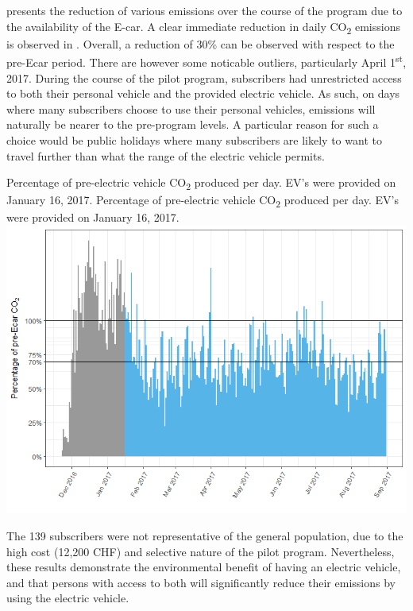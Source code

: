 presents the reduction of various emissions over the course of the program due to the availability of the E-car. 
A clear immediate reduction in daily CO\textsubscript{2} emissions is observed in . 
Overall, a reduction of 30\% can be observed with respect to the pre-Ecar period. 
There are however some noticable outliers, particularly April 1\textsuperscript{st}, 2017. 
During the course of the pilot program, subscribers had unrestricted access to both their personal vehicle and the provided electric vehicle. 
As such, on days where many subscribers choose to use their personal vehicles, emissions will naturally be nearer to the pre-program levels. 
A particular reason for such a choice would be public holidays where many subscribers are likely to want to travel further than what the range of the electric vehicle permits.

\createfigure%
{Percentage of pre-electric vehicle CO\textsubscript{2} produced per day. EV's were provided on January 16, 2017. }%
{Percentage of pre-electric vehicle CO\textsubscript{2} produced per day. EV's were provided on January 16, 2017. }%
{\label{fig:green-class-reduction}}%
{\includegraphics[width=1.0\textwidth, angle=0]{figures/green_class_pollutant_reductions_daily}}%
{}

The 139 subscribers were not representative of the general population, due to the high cost (12,200 CHF) and selective nature of the pilot program.
Nevertheless, these results demonstrate the environmental benefit of having an electric vehicle, and that persons with access to both will significantly reduce their emissions by using the electric vehicle.


